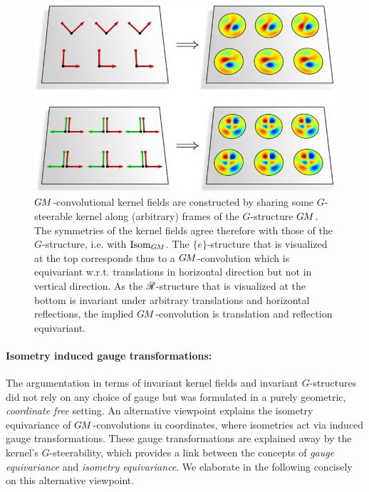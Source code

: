 \begin{figure}
    \centering
    \includegraphics[width=.62\textwidth]{figures/intro_invariant_kernel_fields_plane.pdf}
    \captionsetup{width=.92\textwidth}
    \caption{\small
        \mbox{$G\mkern-1.4muM$-convolutional} kernel fields are constructed by sharing some $G$-steerable kernel along (arbitrary) frames of the \mbox{$G$-structure} $G\mkern-1.4muM$.
        The symmetries of the kernel fields agree therefore with those of the $G$-structure, i.e. with $\operatorname{Isom}_{G\mkern-1.4muM}$.
        The $\{e\}$-structure that is visualized at the top corresponds thus to a \mbox{$G\mkern-1.4muM$-convolution} which is equivariant w.r.t. translations in horizontal direction but not in vertical direction.
        As the \mbox{$\mathscr{R}$-structure} that is visualized at the bottom is invariant under arbitrary translations and horizontal reflections, the implied \mbox{$G\mkern-1.4muM$-convolution} is translation and reflection equivariant.
        \\[-5pt]
        }
    \label{fig:intro_invariant_kernel_fields_plane}
\end{figure}






\paragraph{Isometry induced gauge transformations:}

The argumentation in terms of invariant kernel fields
and invariant $G$-structures did not rely on any choice of gauge but was formulated in a purely geometric, \emph{coordinate free} setting.
An alternative viewpoint explains the isometry equivariance of $G\mkern-1.4muM$-convolutions in coordinates, where isometries act via induced gauge transformations.
These gauge transformations are explained away by the kernel's $G$-steerability, which provides a link between the concepts of \emph{gauge equivariance} and \emph{isometry equivariance}.
We elaborate in the following concisely on this alternative viewpoint.


